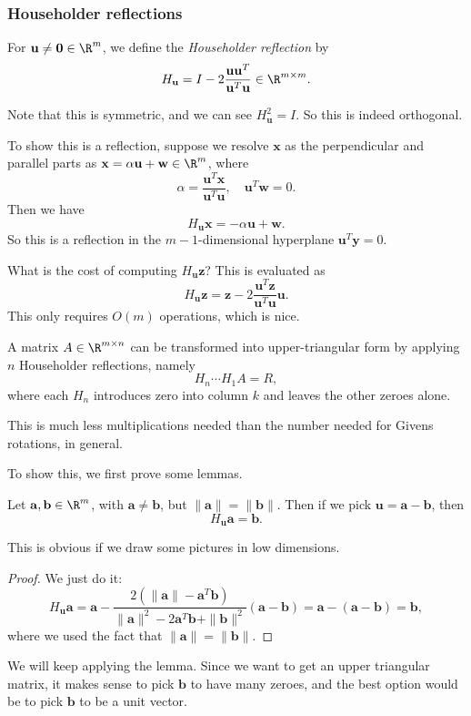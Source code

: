 \documentclass[a4paper]{article}
\begin{document}
\subsubsection*{Householder reflections}
\begin{defi}
  For $\mathbf{u} \not= \mathbf{0} \in \R^m$, we define the \emph{Householder reflection} by
  \[
    H_{\mathbf{u}} = I - 2\frac{\mathbf{u}\mathbf{u}^T}{ \mathbf{u}^T \mathbf{u}} \in \R^{m \times m}.
  \]
\end{defi}
Note that this is symmetric, and we can see $H_{\mathbf{u}}^2 = I$. So this is indeed orthogonal.

To show this is a reflection, suppose we resolve $\mathbf{x}$ as the perpendicular and parallel parts as $\mathbf{x} = \alpha \mathbf{u} + \mathbf{w} \in \R^m$, where
\[
  \alpha = \frac{\mathbf{u}^T \mathbf{x}}{\mathbf{u}^T \mathbf{u}},\quad \mathbf{u}^T \mathbf{w} = 0.
\]
Then we have
\[
  H_{\mathbf{u}} \mathbf{x} = -\alpha \mathbf{u} + \mathbf{w}.
\]
So this is a reflection in the $m - 1$-dimensional hyperplane $\mathbf{u}^T \mathbf{y} = 0$.

What is the cost of computing $H_{\mathbf{u}}\mathbf{z}$? This is evaluated as
\[
  H_{\mathbf{u}}\mathbf{z} = \mathbf{z} - 2\frac{\mathbf{u}^T \mathbf{z}}{\mathbf{u}^T \mathbf{u}}\mathbf{u}.
\]
This only requires $O(m)$ operations, which is nice.

\begin{prop}
  A matrix $A \in \R^{m \times n}$ can be transformed into upper-triangular form by applying $n$ Householder reflections, namely
  \[
    H_n \cdots H_1 A = R,
  \]
  where each $H_n$ introduces zero into column $k$ and leaves the other zeroes alone.
\end{prop}
This is much less multiplications needed than the number needed for Givens rotations, in general.

To show this, we first prove some lemmas.

\begin{lemma}
  Let $\mathbf{a}, \mathbf{b} \in \R^m$, with $\mathbf{a} \not= \mathbf{b}$, but $\|\mathbf{a}\| = \|\mathbf{b}\|$. Then if we pick $\mathbf{u} = \mathbf{a} - \mathbf{b}$, then
  \[
    H_\mathbf{u} \mathbf{a} = \mathbf{b}.
  \]
\end{lemma}
This is obvious if we draw some pictures in low dimensions.
\begin{proof}
  We just do it:
  \[
    H_\mathbf{u} \mathbf{a} = \mathbf{a} - \frac{2(\|\mathbf{a}\| - \mathbf{a}^T \mathbf{b})}{\|\mathbf{a}\|^2 - 2\mathbf{a}^T \mathbf{b} + \|\mathbf{b}\|^2} (\mathbf{a} - \mathbf{b}) = \mathbf{a} - (\mathbf{a} - \mathbf{b}) = \mathbf{b},
  \]
  where we used the fact that $\|\mathbf{a}\| = \|\mathbf{b}\|$.
\end{proof}
We will keep applying the lemma. Since we want to get an upper triangular matrix, it makes sense to pick $\mathbf{b}$ to have many zeroes, and the best option would be to pick $\mathbf{b}$ to be a unit vector.
\end{document}
